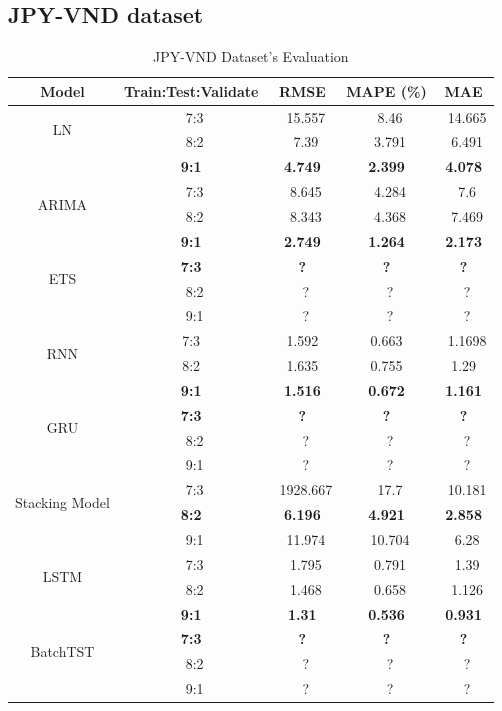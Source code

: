 \documentclass{ieeeojies}
\begin{document}
\subsection{JPY-VND dataset} 
\begin{table}[H]
    \centering
    \begin{tabular}{|c|c|c|c|c|}
         \hline
         \centering Model & Train:Test:Validate & RMSE & MAPE (\%) & MAE\\
         \hline
         \multirow{2}{*}{LN} &\ 7:3 &\ 15.557 &\ 8.46 &\ 14.665 \\ &\ 8:2 &\ 7.39 &\ 3.791 &\ 6.491 \\&\textbf{9:1} &\textbf{4.749} &\textbf{2.399} &\textbf{4.078} \\
         \hline
         \multirow{2}{*}{ARIMA} &\ 7:3 &\ 8.645 &\ 4.284 &\ 7.6 \\ &\ 8:2 &\ 8.343 &\ 4.368 &\ 7.469  \\ &\textbf{9:1} &\textbf{2.749} &\textbf{1.264} &\textbf{2.173} \\
         \hline
         \multirow{2}{*}{ETS} &\textbf{7:3} &\textbf{?}&\textbf{?}&\textbf{?} \\ &\ 8:2 &\ ?&\ ? &\ ? \\&\ 9:1 &\ ? &\ ? &\ ? \\
         \hline
         \multirow{2}{*}{RNN} &  7:3  & 1.592 & 0.663 &\ 1.1698 \\ & 8:2  & 1.635  & 0.755  & 1.29 \\&\textbf{9:1} &\textbf{1.516} &\textbf{0.672} &\textbf{1.161} \\
         \hline
         \multirow{2}{*}{GRU} &\textbf{7:3} &\textbf{?}&\textbf{?}&\textbf{?} \\ &\ 8:2 &\ ?&\ ? &\ ? \\&\ 9:1 &\ ? &\ ? &\ ? \\
         \hline
         \multirow{2}{*}{Stacking Model} &\ 7:3 &\ 1928.667 &\ 17.7 &\ 10.181 \\ &\textbf{8:2} &\textbf{6.196} &\textbf{4.921} &\textbf{2.858} \\&\ 9:1 &\ 11.974 &\ 10.704 &\ 6.28 \\
         \hline
         \multirow{2}{*}{LSTM} &\ 7:3 &\ 1.795 &\ 0.791 &\ 1.39 \\ &\ 8:2 &\ 1.468&\ 0.658 &\ 1.126 \\&\textbf{9:1} &\textbf{1.31} &\textbf{0.536} &\textbf{0.931} \\
         \hline
         \multirow{2}{*}{BatchTST} &\textbf{7:3} &\textbf{?}&\textbf{?}&\textbf{?} \\ &\ 8:2 &\ ?&\ ? &\ ? \\&\ 9:1 &\ ? &\ ? &\ ? \\
         \hline
    \end{tabular}
    \caption{JPY-VND Dataset's Evaluation}
    \label{mbbresult}
\end{table}
\end{document}
